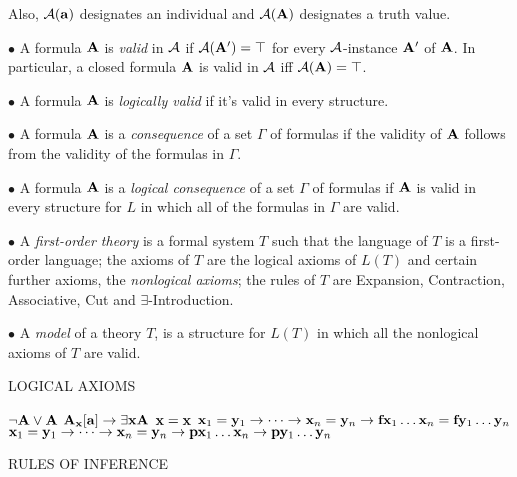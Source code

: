Also, ${\cal A}({\bf a})$ designates an individual and ${\cal A}({\bf A})$ designates a truth value.
\smallskip

\item{$\bullet$} A formula ${\bf A}$ is {\it valid} in ${\cal A}$ if ${\cal A}({\bf A}') = \top$ for 
every ${\cal A}$-instance ${\bf A}'$ of ${\bf A}$. In particular, a closed formula ${\bf A}$ is valid in
${\cal A}$ iff ${\cal A}({\bf A}) = \top$.
\smallskip

\item{$\bullet$} A formula ${\bf A}$ is {\it logically valid} if it's valid in every structure.
\smallskip

\item{$\bullet$} A formula ${\bf A}$ is a {\it consequence} of a set $\Gamma$ of formulas if the 
validity of ${\bf A}$ follows from the validity of the formulas in $\Gamma$.
\smallskip

\item{$\bullet$} A formula ${\bf A}$ is a {\it logical consequence} of a set $\Gamma$ of formulas 
if ${\bf A}$ is valid in every structure for $L$ in which all of the formulas in $\Gamma$ are valid.
\smallskip

\item{$\bullet$} A {\it first-order theory} is a formal system $T$ such that
 the language of $T$ is a first-order language;
 the axioms of $T$ are the logical axioms of $L(T)$ and certain further axioms, the {\it nonlogical axioms};
 the rules of $T$ are Expansion, Contraction, Associative, Cut and $\exists$-Introduction.
\smallskip

\item{$\bullet$} A {\it model} of a theory $T$, is a structure for $L(T)$ in which all the nonlogical axioms of $T$ are valid.

\beginsection LOGICAL AXIOMS

{\leftskip 1in
 $\neg {\bf A} \lor {\bf A}$
 ${\bf A}_{\bf x}[{\bf a}] \to \exists {\bf x}{\bf A}$
 ${\bf x} = {\bf x}$
 ${\bf x}_1 = {\bf y}_1 \to \cdots \to {\bf x}_n = {\bf y}_n \to {\bf f}{\bf x}_1 \dots {\bf x}_n = {\bf f}{\bf y}_1 \dots {\bf y}_n$
\itemitem{} ${\bf x}_1 = {\bf y}_1 \to \cdots \to {\bf x}_n = {\bf y}_n \to {\bf p}{\bf x}_1 \dots {\bf x}_n \to {\bf p}{\bf y}_1 \dots {\bf y}_n$
\par}

\beginsection RULES OF INFERENCE

